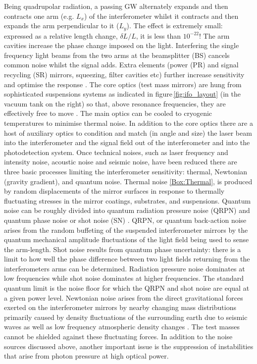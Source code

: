 Being quadrupolar radiation, a passing GW alternately expands and then contracts one arm (e.g. $L_x$) of the interferometer whilst it contracts and then expands the arm perpendicular to it ($L_y$).  The effect is extremely small: expressed as a relative length change, $\delta L/L$, it is less than $10^{-22}$! The arm cavities increase the phase change imposed on the light. Interfering the single frequency light beams from the two arms at the beamsplitter (BS) cancels common noise whilst the signal adds. Extra elements (power (PR) and signal recycling (SR) mirrors, squeezing, filter cavities etc)  further increase sensitivity and optimise the response \cite{InterferometerTechniquesBond2017}.  
The core optics (test mass mirrors) are hung from sophisticated suspensions systems as indicated in figure\,\ref{fig:ifo_layout} (in the vacuum tank on the right) so that, above resonance frequencies, they are effectively free to move \cite{SuspensionsvVeggel2018}. The main optics can be cooled to cryogenic temperatures to minimise thermal noise. In addition to the  core optics there are a host of auxiliary optics to condition  and match (in angle and size) the laser beam into the interferometer  and the signal field out of the interferometer and into the photodetection system. Once technical noises, such as laser frequency and intensity noise, acoustic noise and seismic noise, have been reduced there are three basic processes limiting the interferometer sensitivity: thermal, Newtonian (gravity gradient), and quantum noise. Thermal noise \ref{Box:Thermal},\cite{ThermalNoiseHammond2014} is produced by random displacements of the mirror surfaces in response to thermally fluctuating stresses in the mirror coatings, substrates, and suspensions. Quantum noise can be roughly divided into quantum radiation pressure noise (QRPN) and quantum phase noise or shot noise (SN) \cite{QuantumNoiseBarsotti2018}. QRPN, or quantum back-action noise arises from the random buffeting of the suspended interferometer mirrors by the quantum mechanical amplitude fluctuations of the light field being used to sense the arm-length. Shot noise results from quantum phase uncertainty: there is a limit to how well the phase difference between two light fields returning from the interferometers arms can be determined. Radiation pressure noise dominates at low frequencies while shot noise dominates at higher frequencies. The standard quantum limit is the noise floor for which the QRPN and shot noise are equal at a given power level. Newtonian noise arises from the direct gravitational forces exerted on the interferometer mirrors by nearby changing mass distributions primarily caused by density fluctuations of the surrounding earth due to seismic waves as well as low frequency atmospheric density changes \cite{InfrasoundNewtonianNoise2018}. The test masses cannot be shielded against these fluctuating forces.  In addition to the noise sources discussed above, another important issue is the suppression of instabilities that arise from photon pressure at high optical power. 

